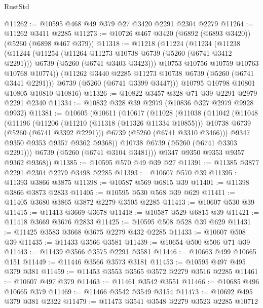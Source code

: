 \begin{lexlean}{RustStd}
\begin{coremodule}
@11262 := @10595 @468 @49 @379 @27 @3420 @2291 @2304 @2279
@11264 := @11262 @3411 @2285
@11273 := @10726 @467 @3420 (@6892 (@6893 @3420)) (@5260 (@6898 @467 @379))
@11318 := @11218
    (@11224
      (@11234
        (@11238
          (@11244
            (@11254
              (@11264 @11273 @10738 @6739 (@5260 (@6741 @3412 @2291)))
              @6739
              (@5260 (@6741 @3403 @3423)))
            @10753
            @10756
            @10759
            @10763
            @10768
            @10774))
        (@11262 @3440 @2285 @11273 @10738 @6739 (@5260 (@6741 @3441 @2291)))
        @6739
        (@5260 (@6741 @3399 @3447)))
      @10795
      @10798
      @10801
      @10805
      @10810
      @10816)
@11326 := @10822 @3457 @328 @71 @39 @2291 @2979 @2291 @2340
@11334 := @10832 @328 @39 @2979 (@10836 @327 @2979 @9928 @9932)
@11381 := @10605
    (@10611
      (@10617
        (@11028
          (@11038
            (@11042
              (@11048
                (@11196
                  (@11206
                    (@11210 (@11318 (@11326 @11334 @10855)))
                    @10738
                    @6739
                    (@5260 (@6741 @3392 @2291)))
                  @6739
                  (@5260 (@6741 @3310 @3466)))
                @9347
                @9350
                @9353
                @9357
                @9362
                @9368))
            @10738
            @6739
            (@5260 (@6741 @3303 @2291)))
          @6739
          (@5260 (@6741 @3104 @3481)))
        @9347
        @9350
        @9353
        @9357
        @9362
        @9368))
@11385 := @10595 @570 @49 @39 @27
@11391 := @11385 @3877 @2291 @2304 @2279 @3498 @2285
@11393 := @10607 @570 @39
@11395 := @11393 @3866 @3875
@11398 := @10587 @569 @6815 @39
@11401 := @11398 @3866 @3873 @2833
@11405 := @10595 @530 @568 @39 @629
@11411 := @11405 @3680 @3865 @3872 @2279 @3505 @2285
@11413 := @10607 @530 @39
@11415 := @11413 @3669 @3678
@11418 := @10587 @529 @6815 @39
@11421 := @11418 @3669 @3676 @2833
@11425 := @10595 @508 @528 @39 @629
@11431 := @11425 @3583 @3668 @3675 @2279 @432 @2285
@11433 := @10607 @508 @39
@11435 := @11433 @3566 @3581
@11439 := @10654 @500 @506 @71 @39
@11443 := @11439 @3566 @3575 @2291 @3581
@11446 := @10663 @499 @10665 @151
@11449 := @11446 @3566 @3573 @3181
@11453 := @10595 @497 @495 @379 @381
@11459 := @11453 @3553 @3565 @3572 @2279 @3516 @2285
@11461 := @10607 @497 @379
@11463 := @11461 @3542 @3551
@11466 := @10685 @496 @10665 @379
@11469 := @11466 @3542 @3549 @3154
@11473 := @10692 @495 @379 @381 @2322
@11479 := @11473 @3541 @3548 @2279 @3523 @2285 @10712

\end{coremodule}
\end{lexlean}
